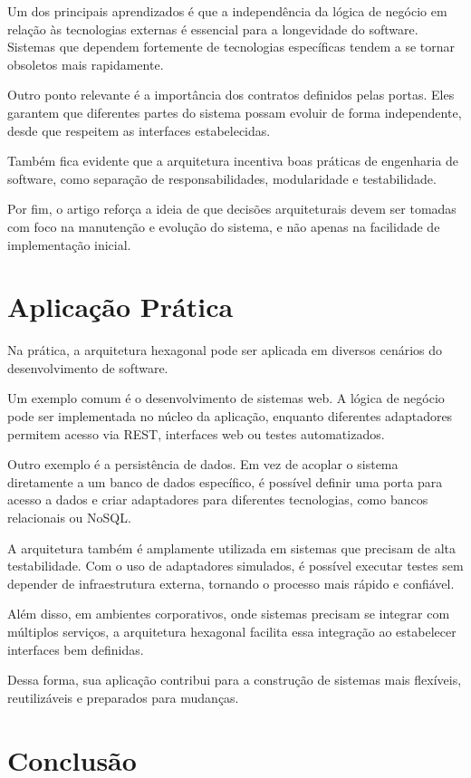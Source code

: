 \documentclass[conference]{IEEEtran}
\begin{document}
Um dos principais aprendizados é que a independência da lógica de negócio em relação às tecnologias externas é essencial para a longevidade do software. Sistemas que dependem fortemente de tecnologias específicas tendem a se tornar obsoletos mais rapidamente.

Outro ponto relevante é a importância dos contratos definidos pelas portas. Eles garantem que diferentes partes do sistema possam evoluir de forma independente, desde que respeitem as interfaces estabelecidas.

Também fica evidente que a arquitetura incentiva boas práticas de engenharia de software, como separação de responsabilidades, modularidade e testabilidade.

Por fim, o artigo reforça a ideia de que decisões arquiteturais devem ser tomadas com foco na manutenção e evolução do sistema, e não apenas na facilidade de implementação inicial.

\section{Aplicação Prática}

Na prática, a arquitetura hexagonal pode ser aplicada em diversos cenários do desenvolvimento de software.

Um exemplo comum é o desenvolvimento de sistemas web. A lógica de negócio pode ser implementada no núcleo da aplicação, enquanto diferentes adaptadores permitem acesso via REST, interfaces web ou testes automatizados.

Outro exemplo é a persistência de dados. Em vez de acoplar o sistema diretamente a um banco de dados específico, é possível definir uma porta para acesso a dados e criar adaptadores para diferentes tecnologias, como bancos relacionais ou NoSQL.

A arquitetura também é amplamente utilizada em sistemas que precisam de alta testabilidade. Com o uso de adaptadores simulados, é possível executar testes sem depender de infraestrutura externa, tornando o processo mais rápido e confiável.

Além disso, em ambientes corporativos, onde sistemas precisam se integrar com múltiplos serviços, a arquitetura hexagonal facilita essa integração ao estabelecer interfaces bem definidas.

Dessa forma, sua aplicação contribui para a construção de sistemas mais flexíveis, reutilizáveis e preparados para mudanças.

\section{Conclusão}
\end{document}
